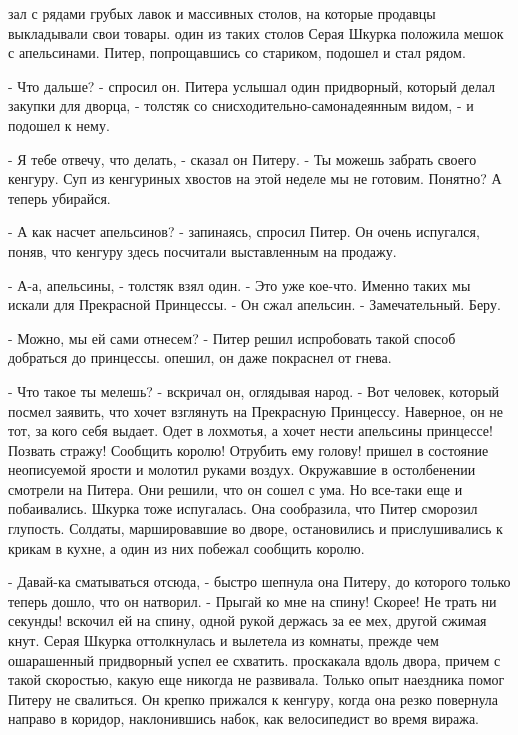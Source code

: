 зал с рядами грубых лавок и массивных столов, на которые продавцы 
выкладывали свои товары.
 один из таких столов Серая Шкурка положила мешок с апельсинами. 
Питер, попрощавшись со стариком, подошел и стал рядом.
\par- Что дальше? - спросил он.
 Питера услышал один придворный, который делал закупки для 
дворца, - толстяк со снисходительно-самонадеянным видом, - и подошел к 
нему.
\par- Я тебе отвечу, что делать, - сказал он Питеру. - Ты можешь 
забрать своего кенгуру. Суп из кенгуриных хвостов на этой неделе мы не 
готовим. Понятно? А теперь убирайся.
\par- А как насчет апельсинов? - запинаясь, спросил Питер. Он очень 
испугался, поняв, что кенгуру здесь посчитали выставленным на продажу.
\par- А-а, апельсины, - толстяк взял один. - Это уже кое-что. Именно 
таких мы искали для Прекрасной Принцессы. - Он сжал апельсин. - 
Замечательный. Беру.
\par- Можно, мы ей сами отнесем? - Питер решил испробовать такой 
способ добраться до принцессы.
 опешил, он даже покраснел от гнева.
\par- Что такое ты мелешь? - вскричал он, оглядывая народ. - Вот 
человек, который посмел заявить, что хочет взглянуть на Прекрасную 
Принцессу. Наверное, он не тот, за кого себя выдает. Одет в лохмотья, 
а хочет нести апельсины принцессе! Позвать стражу! Сообщить королю! 
Отрубить ему голову!
 пришел в состояние неописуемой ярости и молотил руками воздух. 
Окружавшие в остолбенении смотрели на Питера. Они решили, что он сошел 
с ума. Но все-таки еще и побаивались.
 Шкурка тоже испугалась. Она сообразила, что Питер сморозил 
глупость. Солдаты, маршировавшие во дворе, остановились и 
прислушивались к крикам в кухне, а один из них побежал сообщить 
королю.
\par- Давай-ка сматываться отсюда, - быстро шепнула она Питеру, до 
которого только теперь дошло, что он натворил. - Прыгай ко мне на 
спину! Скорее! Не трать ни секунды!
 вскочил ей на спину, одной рукой держась за ее мех, другой 
сжимая кнут. Серая Шкурка оттолкнулась и вылетела из комнаты, прежде 
чем ошарашенный придворный успел ее схватить.
 проскакала вдоль двора, причем с такой скоростью, какую еще 
никогда не развивала. Только опыт наездника помог Питеру не свалиться. 
Он крепко прижался к кенгуру, когда она резко повернула направо в 
коридор, наклонившись набок, как велосипедист во время виража. 
